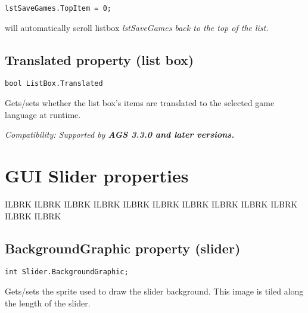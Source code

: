 \begin{verbatim}
lstSaveGames.TopItem = 0;
\end{verbatim}
will automatically scroll listbox \it{lstSaveGames} back to the top of the list.

\subsection{Translated property (list box)}\label{ListBox.Translated}%

\begin{verbatim}
bool ListBox.Translated
\end{verbatim}
Gets/sets whether the list box's items are translated to the selected game language at runtime.

\it{Compatibility:} Supported by \bf{AGS 3.3.0} and later versions.



\section{GUI Slider properties}%

ILBRK
ILBRK
ILBRK
ILBRK
ILBRK
ILBRK
ILBRK
ILBRK
ILBRK
ILBRK
ILBRK
ILBRK


\subsection{BackgroundGraphic property (slider)}\label{Slider.BackgroundGraphic}%

\begin{verbatim}
int Slider.BackgroundGraphic;
\end{verbatim}
Gets/sets the sprite used to draw the slider background. This image is tiled along the length
of the slider.

